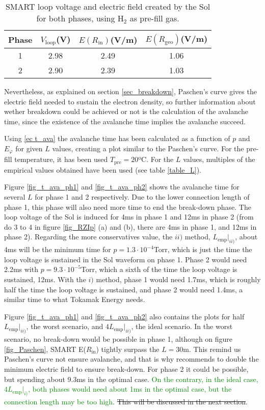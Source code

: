 \documentclass[a4paper,12pt,oneside]{book}
\begin{document}
\begin{table}[htbp]
\centering
	\begin{tabular}{|c|c|c|c|} \hline
Phase	 & $V_\text{loop}$(V) & $E(R_\text{in})$(V/m) & $E(R_\text{geo})$(V/m) \\ \hline
	1 & 2.98 & 2.49 & 1.06 \\ \hline
	2 & 2.90 & 2.39 & 1.03 \\ \hline
	\end{tabular}
	\caption{SMART loop voltage and electric field created by the Sol for both phases, using H$_2$ as pre-fill gas.}
\label{table_Paschen_SMART}
\end{table}

Nevertheless, as explained on section \ref{sec_breakdown}, Paschen's curve gives the electric field needed to sustain the electron density, so further information about wether breakdown could be achieved or not is the calculation of the avalanche time, since the existence of the avalanche time implies the avalanche succeed. 

Using \eqref{ec t_ava} the avalanche time has been calculated as a function of $p$ and $E_\varphi$ for given $L$ values, creating a plot similar to the Paschen's curve. For the pre-fill temperature, it has been used $T_\text{pre}=20$ºC. For the $L$ values, multiples of the empirical values obtained have been used (see table \ref{table_L}).

Figure \ref{fig_t_ava_ph1} and \ref{fig_t_ava_ph2} shows the avalanche time for several $L$ for phase 1 and 2 respectively. Due to the lower connection length of phase 1, this phase will also need more time to end the break-down phase. The loop voltage of the Sol is induced for 4ms in phase 1 and 12ms in phase 2 (from do 3 to 4 in figure \ref{fig_RZIp} (a) and (b), there are 4ms in phase 1, and 12ms in phase 2). Regarding the more conservatives value, the $ii)$ method, $L_\text{emp}|_{ii)}$, about 4ms will be the minimum time for $p=1.3 \cdot 10^{-4}$Torr, which is just the time the  loop voltage is sustained in the Sol waveform on phase 1. Phase 2 would need 2.2ms with $p=9.3 \cdot 10^{-5}$Torr, which a sixth of the time the loop voltage is sustained, 12ms. With the $i)$ method, phase 1 would need 1.7ms, which is roughly half the time the loop voltage is sustained, and phase 2 would need 1.4ms, a similar time to what Tokamak Energy needs.

Figure \ref{fig_t_ava_ph1} and \ref{fig_t_ava_ph2} also contains the plots for half $L_\text{emp}|_{ii)}$, the worst scenario, and $4 L_\text{emp}|_{ii)}$, the ideal scenario. In the worst scenario, no break-down would be possible in phase 1, although on figure \ref{fig_Paschen}, SMART E($R_\text{in}$) tightly surpass the $L=30$m. This remind us Paschen's curve not ensure avalanche, and that is why \cite{ITER_2007} recommends to double the minimum electric field to ensure break-down. For phase 2 it could be possible, but spending about 9.3ms in the optimal case. \textcolor{green}{On the contrary, in the ideal case, $4 L_\text{emp}|_{i)}$, both phases would need about 1ms in the optimal case, but the connection length may be too high}. \st{This will be discussed in the next section}.
\end{document}

